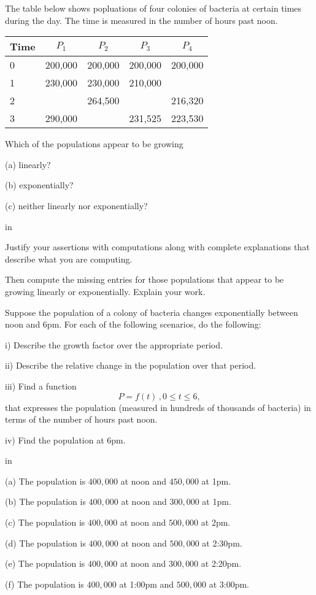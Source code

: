 \documentclass{ximera}
\newcommand{\pskip}{\vskip 0.1 in}
\begin{document}
\begin{question} \label{Q12:ExponentialG}

The table below shows popluations of four colonies of bacteria at certain times during the day. The time is measured in the number of hours past noon.
\begin{center}
  \begin{tabular}{ | l | c | c |c|c| }
    \hline 
    Time & $P_1$ & $P_2$ & $P_3$ & $P_4$\\ \hline
    0 & 200,000  & 200,000 & 200,000 & 200,000\\ \hline
    1 & 230,000 & 230,000 & 210,000 & \\ \hline
    2 &   & 264,500 & & 216,320\\ \hline
    3 & 290,000 & &231,525 & 223,530\\  \hline
  \end{tabular}
\end{center}

Which of the populations appear to be growing

(a) linearly?

(b) exponentially?

(c) neither linearly nor exponentially?

\pskip

Justify your assertions with computations along with complete explanations that describe what you are computing. 

Then compute the missing entries for those populations that appear to be growing linearly or exponentially. Explain your work.

\end{question}




\begin{example} \label{E1:ExpGrowth}
Suppose the population of a colony of bacteria changes exponentially between noon and 6pm. For each of the following scenarios, do the following:

i) Describe the growth factor over the appropriate period.

ii) Describe the relative change in the population over that period.

iii) Find a function
\[
       P = f(t) \, , 0\leq t \leq 6 ,
\]
that expresses the population (measured in hundreds of thousands of bacteria) in terms of the number of hours past noon.

iv) Find the population at 6pm.

\pskip

(a) The population is $400,000$ at noon and $450,000$ at 1pm.

(b) The population is $400,000$ at noon and $300,000$ at 1pm.

(c) The population is $400,000$ at noon and $500,000$ at 2pm.

(d) The population is $400,000$ at noon and $500,000$ at 2:30pm.

(e)  The population is $400,000$ at noon and $300,000$ at 2:20pm.

(f)  The population is $400,000$ at 1:00pm and $500,000$ at 3:00pm.

\end{example}
\end{document}
